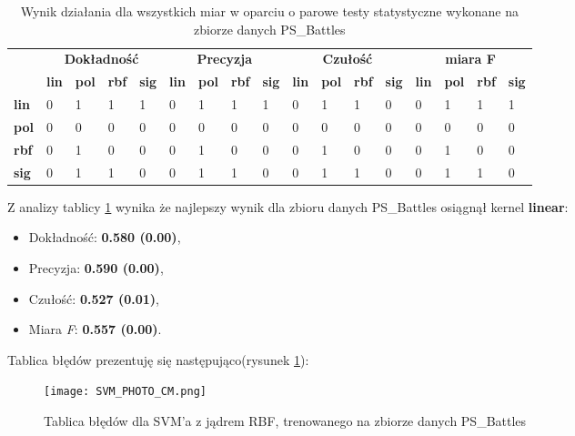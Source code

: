 \begin{table}[h!]
	\centering
	\begin{tabular}{l|l|l|l|l|l|l|l|l|l|l|l|l|l|l|l|l|}
		\cline{2-17}
		&
		\multicolumn{4}{c|}{\textbf{Dokładność}} &
		\multicolumn{4}{c|}{\textbf{Precyzja}} &
		\multicolumn{4}{c|}{\textbf{Czułość}} &
		\multicolumn{4}{c|}{\textbf{miara F}} \\ \cline{2-17} 
		\textbf{} &
		\textbf{lin} &
		\textbf{pol} &
		\textbf{rbf} &
		\textbf{sig} &
		\textbf{lin} &
		\textbf{pol} &
		\textbf{rbf} &
		\textbf{sig} &
		\textbf{lin} &
		\textbf{pol} &
		\textbf{rbf} &
		\textbf{sig} &
		\textbf{lin} &
		\textbf{pol} &
		\textbf{rbf} &
		\textbf{sig} \\ \hline
		\multicolumn{1}{|l|}{\textbf{lin}}  & 0 & 1 & 1 & 1 & 0 & 1 & 1 & 1 & 0 & 1 & 1 & 0 & 0 & 1 & 1 & 1 \\ \hline
		\multicolumn{1}{|l|}{\textbf{pol}}    & 0 & 0 & 0 & 0 & 0 & 0 & 0 & 0 & 0 & 0 & 0 & 0 & 0 & 0 & 0 & 0 \\ \hline
		\multicolumn{1}{|l|}{\textbf{rbf}}     & 0 & 1 & 0 & 0 & 0 & 1 & 0 & 0 & 0 & 1 & 0 & 0 & 0 & 1 & 0 & 0 \\ \hline
		\multicolumn{1}{|l|}{\textbf{sig}} & 0 & 1 & 1 & 0 & 0 & 1 & 1 & 0 & 0 & 1 & 1 & 0 & 0 & 1 & 1 & 0 \\ \hline
	\end{tabular}
	\caption{Wynik działania dla wszystkich miar w oparciu o parowe testy statystyczne wykonane na zbiorze danych PS\_Battles }
	\label{tab:result_p}
\end{table}

Z analizy tablicy \ref{tab:result_p} wynika że najlepszy wynik dla zbioru danych PS\_Battles osiągnął kernel \textbf{linear}:
\begin{itemize}
	\item Dokładność: \textbf{0.580 (0.00)},
	\item Precyzja: \textbf{0.590 (0.00)},
	\item Czułość: \textbf{0.527 (0.01)},
	\item Miara \textit{F}: \textbf{0.557 (0.00)}.
\end{itemize}
Tablica błędów prezentuję się następująco(rysunek \ref{fig:rbf_cm_casia}):

\begin{figure}[h!]
	\texttt{[image: SVM\_PHOTO\_CM.png]}
	\centering
	\caption{Tablica błędów dla SVM'a z jądrem RBF, trenowanego na zbiorze danych PS\_Battles}
	\label{fig:rbf_cm_casia}
\end{figure}

